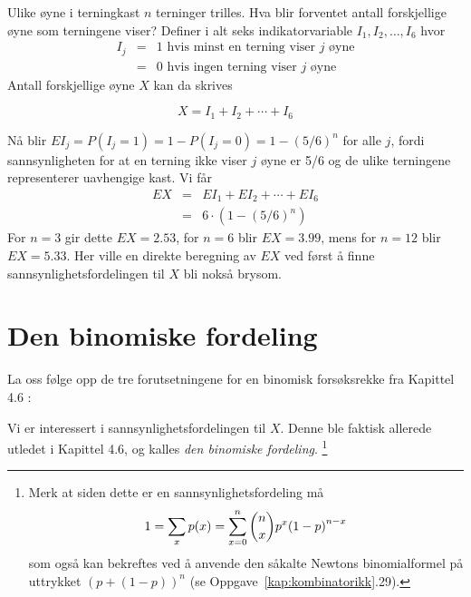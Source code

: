\begin{eksempel}{Ulike øyne i terningkast}
$n$ terninger trilles. Hva blir forventet antall forskjellige
øyne som terningene viser? Definer i alt seks indikatorvariable
$I_1, I_2, \ldots, I_6$ hvor
\begin{eqnarray*}
     I_j&=&1 \mbox{\ \ hvis minst en terning viser $j$ øyne} \\
        &=&0 \mbox{\ \ hvis ingen terning viser $j$ øyne}
\end{eqnarray*}
\noindent Antall forskjellige øyne $X$ kan da skrives

\[ X=I_1+I_2+\cdots +I_6 \]

\noindent Nå blir $EI_j=P(I_j=1)=1-P(I_j=0)=1-{(5/6)}^n$ for alle $j$,
fordi sannsynligheten for at en terning ikke viser $j$ øyne er 5/6 og
de ulike terningene representerer uavhengige kast. Vi får
\begin{eqnarray*}
 EX&=&EI_1+EI_2+\cdots +EI_6 \\
   &=&6 \cdot (1-{(5/6)}^n)
\end{eqnarray*}
\noindent For $n=3$ gir dette $EX=2.53$, for $n=6$ blir $EX=3.99$, mens for
$n=12$ blir $EX=5.33$. Her ville en direkte beregning av $EX$ ved først
å finne sannsynlighetsfordelingen til $X$ bli nokså brysom.
\end{eksempel}

\section{Den binomiske fordeling}
La oss følge opp de tre forutsetningene for en binomisk
forsøksrekke fra Kapittel 4.6 :
\begin{center}  \end{center}
\noindent Vi er interessert i sannsynlighetsfordelingen til $X$. Denne
ble faktisk allerede utledet i Kapittel 4.6, og kalles {\em den binomiske
fordeling}.
\footnote{Merk at siden dette er en sannsynlighetsfordeling må
\[ 1=\sum_x p(x)=\sum_{x=0}^n {{n}\choose{x}}p^x{(1-p)}^{n-x} \]
\noindent som også kan bekreftes ved å anvende den såkalte
Newtons binomialformel på uttrykket ${(p+(1-p))}^n$ (se Oppgave~\ref*{kap:kombinatorikk}.29).}

